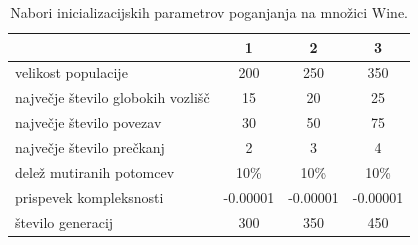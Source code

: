 \begin{table}[H]
    \begin{center}
        \begin{tabular}{||l c c c||}
            \hline
            & 1        & 2        & 3 \\ [0.5ex]
            \hline
            velikost populacije               & 200      & 250      & 350      \\
            \hline
            največje število globokih vozlišč & 15       & 20       & 25       \\
            \hline
            največje število povezav          & 30       & 50       & 75       \\
            \hline
            največje število prečkanj         & 2        & 3        & 4        \\
            \hline
            delež mutiranih potomcev          & 10\%     & 10\%     & 10\%     \\
            \hline
            prispevek kompleksnosti           & -0.00001 & -0.00001 & -0.00001 \\
            \hline
            število generacij                 & 300      & 350      & 450      \\
            \hline
        \end{tabular}
    \end{center}
    \caption{Nabori inicializacijskih parametrov poganjanja na množici Wine.}
    \label{tab:param_wine}
\end{table}

